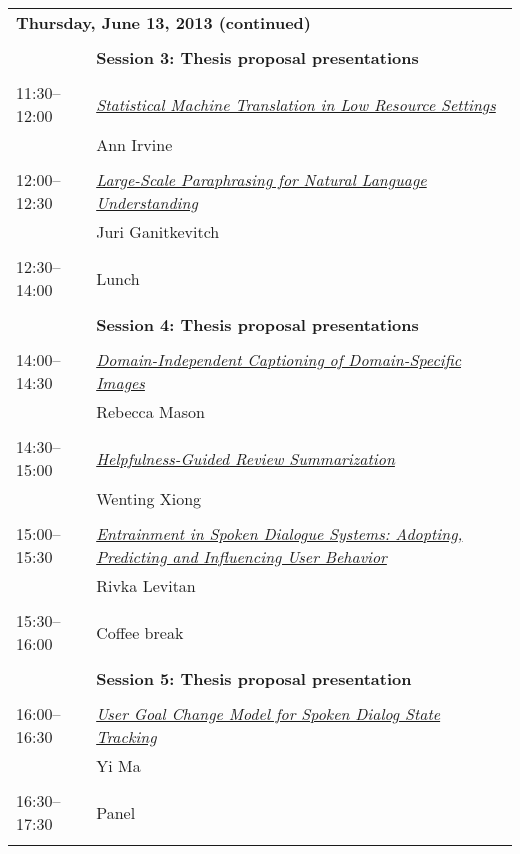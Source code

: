\newpage
\begin{tabular}{p{20mm}p{138mm}}
\\
\multicolumn{2}{l}{\bf Thursday, June 13, 2013
 (continued)} \\\\
 & {\bf Session 3: Thesis proposal presentations
} \\
\\
11:30--12:00 & \hyperlink{page.54}{\em Statistical Machine Translation in Low Resource Settings}\\
         & Ann Irvine \\
\\

12:00--12:30 & \hyperlink{page.62}{\em Large-Scale Paraphrasing for Natural Language Understanding}\\
         & Juri Ganitkevitch \\
\\

12:30--14:00 &  Lunch
 \\
\\
 & {\bf Session 4: Thesis proposal presentations
} \\
\\
14:00--14:30 & \hyperlink{page.69}{\em Domain-Independent Captioning of Domain-Specific Images}\\
         & Rebecca Mason \\
\\

14:30--15:00 & \hyperlink{page.77}{\em Helpfulness-Guided Review Summarization}\\
         & Wenting Xiong \\
\\

15:00--15:30 & \hyperlink{page.84}{\em Entrainment in Spoken Dialogue Systems: Adopting, Predicting and Influencing User Behavior}\\
         & Rivka Levitan \\
\\

15:30--16:00 &  Coffee break
 \\
\\
 & {\bf Session 5: Thesis proposal presentation
} \\
\\
16:00--16:30 & \hyperlink{page.91}{\em User Goal Change Model for Spoken Dialog State Tracking}\\
         & Yi Ma \\
\\

16:30--17:30 & Panel \\
\\


\end{tabular}
